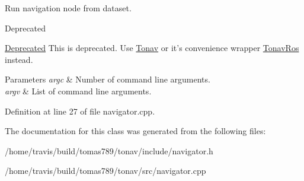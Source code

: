 Run navigation node from dataset. 

\begin{DoxyRefDesc}{Deprecated}
\item[\hyperlink{deprecated__deprecated000003}{Deprecated}]This is deprecated. Use \hyperlink{class_tonav}{Tonav} or it's convenience wrapper \hyperlink{class_tonav_ros}{Tonav\-Ros} instead.\end{DoxyRefDesc}



\begin{DoxyParams}{Parameters}
{\em argc} & Number of command line arguments. \\
\hline
{\em argv} & List of command line arguments. \\
\hline
\end{DoxyParams}


Definition at line 27 of file navigator.\-cpp.



The documentation for this class was generated from the following files\-:\begin{DoxyCompactItemize}
\item 
/home/travis/build/tomas789/tonav/include/navigator.\-h\item 
/home/travis/build/tomas789/tonav/src/navigator.\-cpp\end{DoxyCompactItemize}
